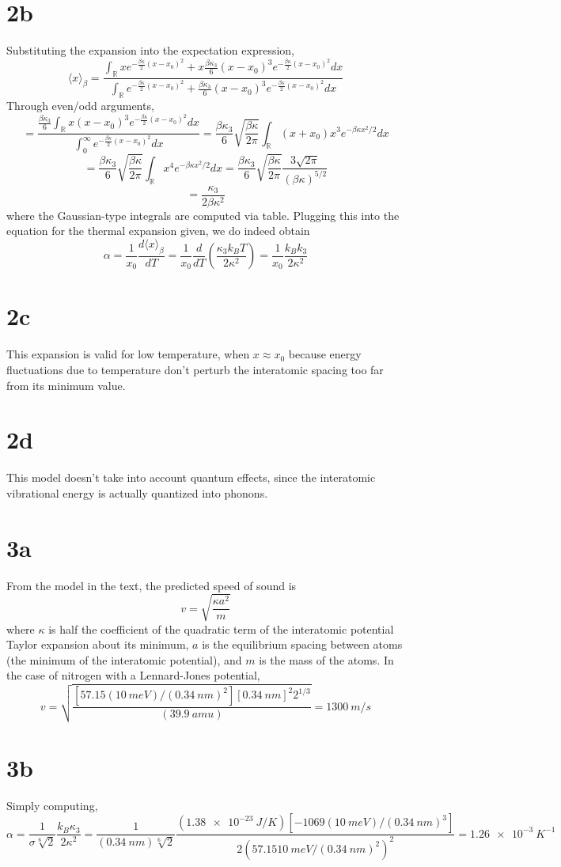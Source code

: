 \documentclass{article}
\begin{document}
\section*{2b}
Substituting the expansion into the expectation expression,
\[
  \langle x \rangle_{\beta}=\frac{\int_{\mathbb{R}}xe^{-\frac{\beta\kappa}{2}(x-x_{0})^{2}}
    +x\frac{\beta\kappa_{3}}{6}(x-x_{0})^{3}e^{-\frac{\beta\kappa}{2}(x-x_{0})^{2}}dx}
  {\int_{\mathbb{R}}e^{-\frac{\beta\kappa}{2}(x-x_{0})^{2}}+\frac{\beta\kappa_{3}}{6}(x-x_{0})^{3}e^{-\frac{\beta\kappa}{2}(x-x_{0})^{2}}dx}
\]
Through even/odd arguments,
\[
  =\frac{\frac{\beta\kappa_{3}}{6}\int_{\mathbb{R}}x(x-x_{0})^{3}e^{-\frac{\beta\kappa}{2}(x-x_{0})^{2}}dx}
  {\int_{0}^{\infty}e^{-\frac{\beta\kappa}{2}(x-x_{0})^{2}}dx}
  =\frac{\beta\kappa_{3}}{6}\sqrt{\frac{\beta\kappa}{2\pi}}\int_{\mathbb{R}}(x+x_{0})x^{3}e^{-\beta\kappa x^{2}/2}dx
\]
\[
  =\frac{\beta\kappa_{3}}{6}\sqrt{\frac{\beta\kappa}{2\pi}}\int_{\mathbb{R}}x^{4}e^{-\beta\kappa x^{2}/2}dx
  =\frac{\beta\kappa_{3}}{6}\sqrt{\frac{\beta\kappa}{2\pi}}\frac{3\sqrt{2\pi}}{(\beta\kappa)^{5/2}}
\]
\[
  =\frac{\kappa_{3}}{2\beta\kappa^{2}}
\]
where the Gaussian-type integrals are computed via table.
Plugging this into the equation for the thermal expansion given, we do indeed obtain
\[
  \alpha=\frac{1}{x_{0}}\frac{d\langle x \rangle_{\beta}}{dT}=\frac{1}{x_{0}}\frac{d}{dT}\left( \frac{\kappa_{3}k_{B}T}{2\kappa^{2}} \right)
  =\frac{1}{x_{0}}\frac{k_{B}k_{3}}{2\kappa^{2}}
\]

\section*{2c}
This expansion is valid for low temperature, when $x\approx x_{0}$ because energy fluctuations due to temperature don't perturb
the interatomic spacing too far from its minimum value.

\section*{2d}
This model doesn't take into account quantum effects, since the interatomic vibrational energy is actually quantized into phonons.

\section*{3a}
From the model in the text, the predicted speed of sound is
\[
  v=\sqrt{\frac{\kappa a^{2}}{m}}
\]
where $\kappa$ is half the coefficient of the quadratic term of the interatomic potential Taylor expansion about its minimum,
$a$ is the equilibrium spacing between atoms (the minimum of the interatomic potential), and $m$ is the mass of the atoms.
In the case of nitrogen with a Lennard-Jones potential,
\[
  v=\sqrt{\frac{[57.15(\SI{10}{meV})/(\SI{0.34}{nm})^{2}][\SI{0.34}{nm}]^{2}2^{1/3}}{(\SI{39.9}{amu})}}
  =\SI{1300}{m/s}
\]

\section*{3b}
Simply computing,
\[
  \alpha=\frac{1}{\sigma\sqrt[6]{2}}\frac{k_{B}\kappa_{3}}{2\kappa^{2}}
  =\frac{1}{(\SI{0.34}{nm})\sqrt[6]{2}}\frac{(\SI{1.38e-23}{J/K})[-1069(\SI{10}{meV})/(\SI{0.34}{nm})^{3}]}
  {2(57.15\SI{10}{meV}/(\SI{0.34}{nm})^{2})^{2}}
  =\SI{1.26e-3}{K^{-1}}
\]
\end{document}
